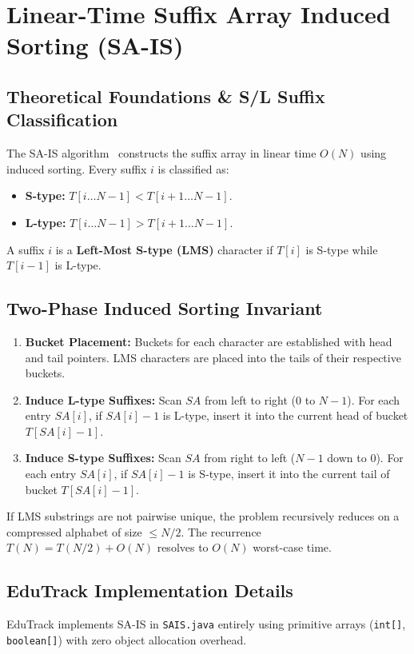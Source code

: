 \section{Linear-Time Suffix Array Induced Sorting (SA-IS)}
\subsection{Theoretical Foundations \& S/L Suffix Classification}
The SA-IS algorithm~\cite{nong2009} constructs the suffix array in linear time $O(N)$ using induced sorting. Every suffix $i$ is classified as:
\begin{itemize}
    \item \textbf{S-type:} $T[i \dots N-1] < T[i+1 \dots N-1]$.
    \item \textbf{L-type:} $T[i \dots N-1] > T[i+1 \dots N-1]$.
\end{itemize}
A suffix $i$ is a \textbf{Left-Most S-type (LMS)} character if $T[i]$ is S-type while $T[i-1]$ is L-type.

\subsection{Two-Phase Induced Sorting Invariant}
\begin{enumerate}
    \item \textbf{Bucket Placement:} Buckets for each character are established with head and tail pointers. LMS characters are placed into the tails of their respective buckets.
    \item \textbf{Induce L-type Suffixes:} Scan $SA$ from left to right ($0$ to $N-1$). For each entry $SA[i]$, if $SA[i] - 1$ is L-type, insert it into the current head of bucket $T[SA[i] - 1]$.
    \item \textbf{Induce S-type Suffixes:} Scan $SA$ from right to left ($N-1$ down to $0$). For each entry $SA[i]$, if $SA[i] - 1$ is S-type, insert it into the current tail of bucket $T[SA[i] - 1]$.
\end{enumerate}
If LMS substrings are not pairwise unique, the problem recursively reduces on a compressed alphabet of size $\le N/2$. The recurrence $T(N) = T(N/2) + O(N)$ resolves to $O(N)$ worst-case time.

\subsection{EduTrack Implementation Details}
EduTrack implements SA-IS in \texttt{SAIS.java} entirely using primitive arrays (\texttt{int[]}, \texttt{boolean[]}) with zero object allocation overhead.

